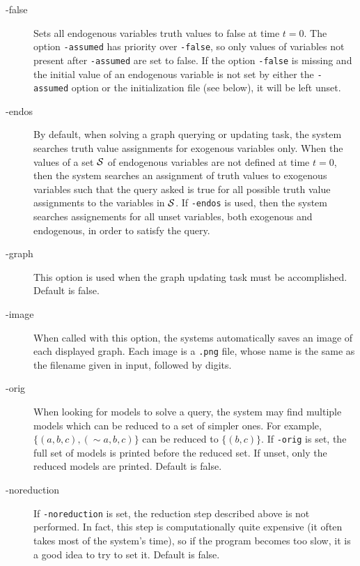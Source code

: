 \documentclass[a4paper]{article}
\renewcommand{\red}[1]{#1}
\begin{document}
\begin{description}
\item[-false] Sets all endogenous variables truth values to false at time
  $t=0$. The option {\tt -assumed} has priority over {\tt -false}, so only values
  of variables not present after {\tt -assumed} are set to
  false. \red{If the  option {\tt -false} is missing and the initial
    value of an endogenous variable is not set by either the {\tt -assumed}
    option or the initialization file (see below), it will be left unset.}
  
\item[-endos] By default, when solving a graph querying or updating
  task, the system searches  truth value
  assignments for exogenous variables only. When the values of a set $\cal
  S$ of endogenous variables are not defined at time $t=0$, then the system
  searches an assignment of truth values to exogenous variables such
  that the query asked is true for all possible truth value assignments
  to the variables in $\cal S$. If {\tt -endos} is used, then the
  system searches assignements for all unset variables, both exogenous
  and endogenous, in order to satisfy the query. 
  
 \item[-graph] This option is used when the graph updating task must
   be accomplished. Default is false.


\item[-image] When called with this option, the systems
  automatically saves an image of each displayed graph. Each image is
  a {\tt .png} file, whose name is the same as the filename given in
  input, followed by digits.

\item[-orig] When looking for models to solve a query, the system may
  find multiple models which can be 
  reduced to a set of  simpler ones. For example,
 $\{(a,b,c),({\sim}a,b,c)\}$ can be reduced to $\{(b,c)\}$.
 If {\tt -orig} is set,
  the full set of models is printed before the reduced set. If unset,
  only the reduced models are printed. Default is false. 

\item[-noreduction] If {\tt -noreduction} is set, the reduction step
  described above is not performed. In fact, this step is
  computationally quite expensive (it often takes most of the system's
  time), 
so if the program becomes too slow, it is a good idea to
  try to set it. Default is false. 


\end{description}
\end{document}
